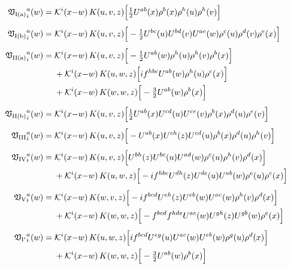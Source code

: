 \begin{align}
{\mathfrak V_{\rm I(a)}}^{a}_{i}(w)=\;&\mathcal{K}^{i}(x{-}w)\,K(u,v,z)\Big[\tfrac{1}{2}U^{ab}(x)\rho^{b}(x)\rho^{h}(u)\rho^{h}(v)\Big]\label{eq:LLT1TI_Nafter}
\\[4pt]
{\mathfrak V_{\rm I(b)}}^{a}_{i}(w)=\;&\mathcal{K}^{i}(x{-}w)\,K(u,v,z)\Big[-\tfrac{1}{2}U^{bc}(u)U^{bd}(v)U^{ae}(w)\rho^{c}(u)\rho^{d}(v)\rho^{e}(x)\Big]\label{eq:LLT1TI_Nbarbefore}
\\[4pt]
{\mathfrak V_{\rm II(a)}}^{a}_{i}(w)=\;&\mathcal{K}^{i}(x{-}w)\,K(u,v,z)\Big[-\tfrac{1}{2}U^{ab}(w)\rho^{h}(u)\rho^{h}(v)\rho^{b}(x)\Big]\notag\\
&+\mathcal{K}^{i}(x{-}w)\,K(u,w,z)\Big[if^{hbc}U^{ab}(w)\rho^{h}(u)\rho^{c}(x)\Big]\notag\\
&+\mathcal{K}^{i}(x{-}w)\,K(w,w,z)\Big[-\tfrac{3}{2}U^{ab}(w)\rho^{b}(x)\Big]\label{eq:LLT1TII_A3}
\\[4pt]
{\mathfrak V_{\rm II(b)}}^{a}_{i}(w)=\;&\mathcal{K}^{i}(x{-}w)\,K(u,v,z)\Big[\tfrac{1}{2}U^{ab}(x)U^{cd}(u)U^{ce}(v)\rho^{b}(x)\rho^{d}(u)\rho^{e}(v)\Big]\label{eq:LLT1TII_A3bar}
\\[4pt]
{\mathfrak V_{\rm III}}^{a}_{i}(w)=\;&\mathcal{K}^{i}(x{-}w)\,K(u,v,z)\Big[-U^{ab}(x)U^{ch}(z)U^{cd}(u)\rho^{b}(x)\rho^{d}(u)\rho^{h}(v)\Big]\label{eq:LLT1TIII}
\\[4pt]
{\mathfrak V_{\rm IV}}^{a}_{i}(w)=\;&\mathcal{K}^{i}(x{-}w)\,K(u,v,z)\Big[U^{bh}(z)U^{bc}(u)U^{ad}(w)\rho^{c}(u)\rho^{h}(v)\rho^{d}(x)\Big]\notag\\
&+\mathcal{K}^{i}(x{-}w)\,K(u,w,z)\Big[-if^{hbc}U^{dh}(z)U^{de}(u)U^{ab}(w)\rho^{e}(u)\rho^{c}(x)\Big]\label{eq:LLT1TIV}
\\[4pt]
{\mathfrak V_{\rm V}}^{a}_{i}(w)=\;&\mathcal{K}^{i}(x{-}w)\,K(w,v,z)\Big[-if^{bcd}U^{eh}(z)U^{eb}(w)U^{ac}(w)\rho^{h}(v)\rho^{d}(x)\Big]\notag\\
&+\mathcal{K}^{i}(x{-}w)\,K(w,w,z)\Big[-f^{bcd}f^{hde}U^{ac}(w)U^{gh}(z)U^{gb}(w)\rho^{e}(x)\Big]\label{eq:LLT1TV}
\\[4pt]
{\mathfrak V_{\rm I'}}^{a}_{i}(w)=\;&\mathcal{K}^{i}(x{-}w)\,K(u,w,z)\Big[if^{bcd}U^{eg}(u)U^{ac}(w)U^{eb}(w)\rho^{g}(u)\rho^{d}(x)\Big]\notag\\
&+\mathcal{K}^{i}(x{-}w)\,K(w,w,z)\Big[-\tfrac{3}{2}U^{ab}(w)\rho^{b}(x)\Big]\label{eq:LLT1TIa}
\end{align}
